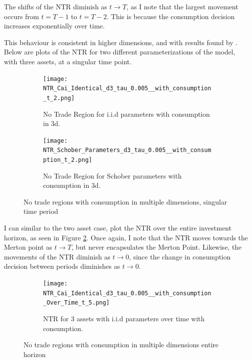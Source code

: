 \documentclass[11pt]{article}
\begin{document}
The shifts of the NTR diminish as $t \to T$, as I note that the largest movement occurs from $t=T-1$ to $t=T-2$.
This is because the consumption decision increases exponentially over time.

This behaviour is consistent in higher dimensions, and with results found by \autocite{Scheidegger2023}.
Below are plots of the NTR for two different parameterizations of the model, with three assets, at a singular time point.
\begin{figure}[!ht]
    \centering
    \begin{subfigure}[t]{0.48\textwidth}
        \centering
        \texttt{[image: NTR\_Cai\_Identical\_d3\_tau\_0.005\_\_with\_consumption\_t\_2.png]}
        \caption{No Trade Region for i.i.d parameters with consumption in 3d.}
    \end{subfigure}%
    \hfill
    \begin{subfigure}[t]{0.48\textwidth}
        \centering
        \texttt{[image: NTR\_Schober\_Parameters\_d3\_tau\_0.005\_\_with\_consumption\_t\_2.png]}
        \caption{No Trade Region for Schober parameters with consumption in 3d.}
    \end{subfigure}
    \caption{No trade regions with consumption in multiple dimensions, singular time period}
\end{figure}
\FloatBarrier 

I can similar to the two asset case, plot the \ac{NTR} over the entire investment horizon, as seen in Figure \ref{fig: NTR_3d_iid_with_consumption_over_time}.
Once again, I note that the NTR moves towards the Merton point as $t \rightarrow T$, but never encapsulates the Merton Point.
Likewise, the movements of the NTR diminish as $t \to 0$, since the change in consumption decision between periods diminishes as $t \to 0$.
\begin{figure}[!ht]
    \begin{subfigure}[t]{0.48\textwidth}
        \centering
        \texttt{[image: NTR\_Cai\_Identical\_d3\_tau\_0.005\_\_with\_consumption\_Over\_Time\_t\_5.png]}
        \caption{NTR for $3$ assets with i.i.d parameters over time with consumption.}
        \label{fig: NTR_3d_iid_with_consumption_over_time}
    \end{subfigure}
    \caption{No trade regions with consumption in multiple dimensions entire horizon}
\end{figure}
\FloatBarrier 
\end{document}
